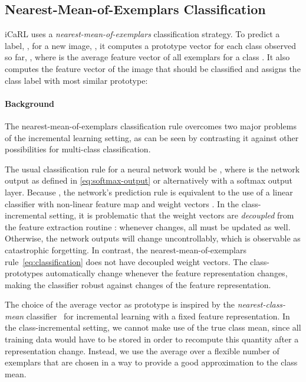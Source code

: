 \documentclass[10pt,twocolumn,letterpaper]{article}
\begin{document}
\subsection{Nearest-Mean-of-Exemplars Classification}\label{subsec:classifier}
iCaRL uses a \emph{nearest-mean-of-exemplars} classification strategy. 
To predict a label, , for a new image, , it computes a 
prototype vector for each class observed so far, , 
where  is the average 
feature vector of all exemplars for a class .
It also computes the feature vector of the image that should 
be classified and assigns the class label with most similar 
prototype: 



\paragraph{Background\onedot} 
The nearest-mean-of-exemplars classification rule
overcomes two major problems of the incremental learning setting, 
as can be seen by contrasting it against other possibilities for 
multi-class classification.

The usual classification rule for a neural network would be 
, where  is the
network output as defined in \eqref{eq:softmax-output} or 
alternatively with a softmax output layer. 
Because , 
the network's prediction rule is equivalent to the use of 
a linear classifier with non-linear feature map  and 
weight vectors . 
In the class-incremental setting, it is problematic that the weight 
vectors  are \emph{decoupled} from the feature extraction 
routine :
whenever  changes, all  must be updated as well.
Otherwise, the network outputs will change uncontrollably, which is 
observable as catastrophic forgetting.
In contrast, the nearest-mean-of-exemplars rule~\eqref{eq:classification}
does not have decoupled weight vectors. The class-prototypes automatically 
change whenever the feature representation changes, making the 
classifier robust against changes of the feature 
representation. 

The choice of the average vector as prototype is inspired by 
the \emph{nearest-class-mean} classifier~\cite{mensink2013distance} 
for incremental learning with a fixed feature representation.
In the class-incremental setting, we cannot make use of the true 
class mean, since all training data would have to be stored in 
order to recompute this quantity after a representation change. 
Instead, we use the average over a flexible number of exemplars that 
are chosen in a way to provide a good approximation to the class 
mean.
\end{document}
